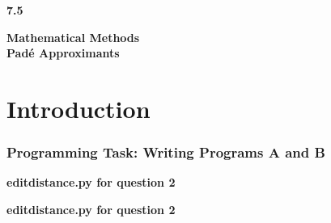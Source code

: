 \documentclass[12pt, a4paper]{article}
\begin{document}
	
	\setlength{\parindent}{0pt}
	\captionsetup{justification=centering}
	\lstset{
		showstringspaces=false
	}
	
	
	\begin{titlepage}
		\LARGE
		\textbf{7.5}
		\begin{center}
			\vspace*{7cm}
			
			\LARGE
			\textbf{Mathematical Methods}
			\\
			\vspace{1cm}
			\textbf{Pad\'e Approximants}
			
			\vspace{0.5cm}
		\end{center}
	\end{titlepage}

\section{Introduction}	
	
\subsubsection*{Programming Task: Writing Programs A and B}




\pagebreak
\textbf{edit\textunderscore distance.py for question 2}\centering\label{question1}

\vspace{2cm}

\pagebreak
\textbf{edit\textunderscore distance.py for question 2}\centering\label{question2}

\vspace{2cm}
\end{document}
